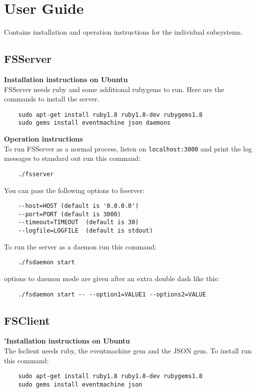 \chapter{User Guide}
\label{appendix:A}
Contains installation and operation instructions for the individual subsystems.

\section{FSServer}
\textbf{Installation instructions on Ubuntu} \\
FSServer needs ruby and some additional rubygems to run. Here are the commands to install the server.
\begin{verbatim}
	sudo apt-get install ruby1.8 ruby1.8-dev rubygems1.8
	sudo gems install eventmachine json daemons
\end{verbatim}

\textbf{Operation instructions} \\
To run FSServer as a normal process, listen on \texttt{localhost:3000} and print the log messages to standard out run this command:
\begin{verbatim}
	./fsserver
\end{verbatim}

You can pass the following options to fsserver:
\begin{verbatim}
    --host=HOST (default is '0.0.0.0')
    --port=PORT (default is 3000)
    --timeout=TIMEOUT  (default is 30)
    --logfile=LOGFILE  (default is stdout)
\end{verbatim}

To run the server as a daemon run this command:
\begin{verbatim}
	./fsdaemon start
\end{verbatim}

options to daemon mode are given after an extra double dash like this:
\begin{verbatim}
	./fsdaemon start -- --option1=VALUE1 --options2=VALUE
\end{verbatim}

\section{FSClient}
\textbf{'Installation instructions on Ubuntu} \\
The fsclient needs ruby, the eventmachine gem and the JSON gem. To install run this command:
\begin{verbatim}
	sudo apt-get install ruby1.8 ruby1.8-dev rubygems1.8
	sudo gems install eventmachine json
\end{verbatim}

